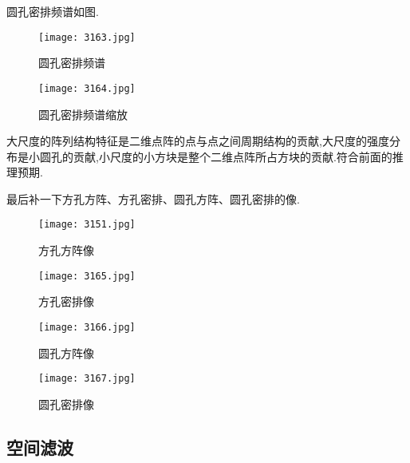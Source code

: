 \documentclass[10pt]{ctexart}
\begin{document}
圆孔密排频谱如图.
\begin{figure}[H]
\begin{minipage}[t]{0.5\linewidth}
\centering
\texttt{[image: 3163.jpg]}
\caption{圆孔密排频谱}
\end{minipage}
\hfill
\begin{minipage}[t]{0.5\linewidth}
\centering
\texttt{[image: 3164.jpg]}
\caption{圆孔密排频谱缩放}
\end{minipage}
\end{figure}
大尺度的阵列结构特征是二维点阵的点与点之间周期结构的贡献,大尺度的强度分布是小圆孔的贡献,小尺度的小方块是整个二维点阵所占方块的贡献.符合前面的推理预期.

最后补一下方孔方阵、方孔密排、圆孔方阵、圆孔密排的像.
\begin{figure}[H]
\begin{minipage}[t]{0.5\linewidth}
\centering
\texttt{[image: 3151.jpg]}
\caption{方孔方阵像}
\end{minipage}
\hfill
\begin{minipage}[t]{0.5\linewidth}
\centering
\texttt{[image: 3165.jpg]}
\caption{方孔密排像}
\end{minipage}
\end{figure}
\begin{figure}[H]
\begin{minipage}[t]{0.5\linewidth}
\centering
\texttt{[image: 3166.jpg]}
\caption{圆孔方阵像}
\end{minipage}
\hfill
\begin{minipage}[t]{0.5\linewidth}
\centering
\texttt{[image: 3167.jpg]}
\caption{圆孔密排像}
\end{minipage}
\end{figure}
\subsection{空间滤波}
\end{document}
